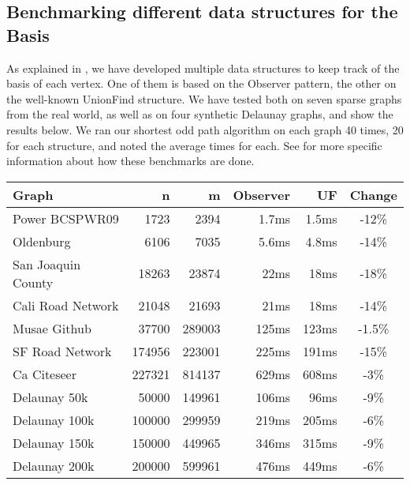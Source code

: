 \subsection{Benchmarking different data structures for the Basis}
\label{subsubsection:testing-basis}
As explained in , we have developed multiple data structures to keep track of the basis of each vertex. One of them is based on the Observer pattern, the other on the well-known UnionFind structure. We have tested both on seven sparse graphs from the real world, as well as on four synthetic Delaunay graphs, and show the results below. We ran our shortest odd path algorithm on each graph 40 times, 20 for each structure, and noted the average times for each. See  for more specific information about how these benchmarks are done.
\begin{center}
    \begin{tabular}{|l | r | r | r | r | c|} 
        \hline
        Graph & n & m & Observer & UF & Change \\ [0.5ex] 
        \hline\hline
        Power BCSPWR09 \cite{graph:bcspwr09} & 1723 & 2394 & 1.7ms & 1.5ms & -12\% \\
        \hline
        Oldenburg \cite{graph:oldenburg-sf-cal-san-roads-etc} & 6106 & 7035 & 5.6ms & 4.8ms & -14\%\\ 
        \hline
        San Joaquin County \cite{graph:oldenburg-sf-cal-san-roads-etc} & 18263 & 23874 & 22ms & 18ms & -18\%\\
        \hline
        Cali Road Network \cite{graph:oldenburg-sf-cal-san-roads-etc} & 21048 & 21693 & 21ms & 18ms & -14\%\\
        \hline
        Musae Github \cite{graph:musae-github} & 37700 & 289003 & 125ms & 123ms & -1.5\%\\
        \hline
        SF Road Network \cite{graph:oldenburg-sf-cal-san-roads-etc} & 174956 & 223001 & 225ms & 191ms & -15\%\\
        \hline
        Ca Citeseer \cite{graph:ca-citeseer} & 227321 & 814137 & 629ms & 608ms & -3\%\\
        \hline
        \hline
        Delaunay 50k & 50000 & 149961 & 106ms & 96ms & -9\%\\
        \hline
        Delaunay 100k & 100000 & 299959 & 219ms & 205ms & -6\%\\
        \hline
        Delaunay 150k & 150000 & 449965 & 346ms & 315ms & -9\%\\
        \hline
        Delaunay 200k & 200000 & 599961 & 476ms & 449ms & -6\%\\
        \hline
    \end{tabular}
\end{center}

